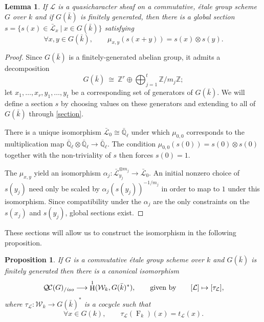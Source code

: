\documentclass[11pt]{amsart}
\theoremstyle{plain}
\newtheorem{proposition}[theorem]{Proposition}
\newtheorem{lemma}[theorem]{Lemma}
\theoremstyle{definition}
\theoremstyle{remark}
\newcommand{\ZZ}{{\mathbb{Z}}}
\newcommand{\EE}{\mathbb{\bar Q}_\ell}
\newcommand{\bFq}{\bar{k}}
\newcommand{\Fq}{k}
\newcommand{\Frob}[1]{\operatorname{F}_{#1}}
\DeclareMathOperator{\Hh}{H}
\newcommand{\tq}{{\ \vert\ }}
\newcommand{\iso}{{\ \cong\ }}
\newcommand{\cs}[1]{{\mathcal{#1}}}
\newcommand{\gcs}[1]{{\mathcal{\bar #1}}}
\newcommand{\QC}{{\mathcal{Q\hskip-0.8pt C}}}
\newcommand{\QCiso}[1]{\QC(#1)_{/\textit{iso}}}
\newcommand{\Weil}[1]{\mathcal{W}_{#1}}
\newcommand{\trFrob}[1]{t_{#1}}
\begin{document}
\begin{lemma}\label{lemma:section}
 If $\cs{L}$ is a quasicharacter sheaf on a commutative, \'etale group scheme $G$ over $\Fq$ and if $G(\bFq)$ is finitely generated, then there is a global section $s = \{ s(x) \in \gcs{L}_x \tq x \in G(\bFq) \}$ satisfying
 \begin{equation}\label{section}
  \forall x,y \in G(\bFq), \qquad \mu_{x,y}(s(x+y)) = s(x)\otimes s(y).
 \end{equation}
\end{lemma}

\begin{proof}
  Since $G(\bFq)$ is a finitely-generated abelian group, it admits a decomposition
  \[
  G(\bFq) \iso \ZZ^r \oplus \bigoplus_{j=1}^t \ZZ / m_j \ZZ;
  \]
  let $x_1, \ldots, x_r, y_1, \ldots, y_t$ be a corresponding set of generators of $G(\bFq)$.
  We will define a section $s$ by choosing values on these generators and extending to all
  of $G(\bFq)$ through \eqref{section}.
  
  There is a unique isomorphism $\gcs{L}_0 \cong \EE$ under which $\mu_{0,0}$ corresponds
  to the multiplication map $\EE \otimes \EE \to \EE$.
  The condition $\mu_{0,0}(s(0)) = s(0) \otimes s(0)$ together with the non-triviality of $s$
  then forces $s(0) = 1$.
  
  The $\mu_{x,y}$ yield an isomorphism $\alpha_j : \gcs{L}_{y_j}^{\otimes m_j} \to \gcs{L}_0$.
  An initial nonzero choice of $s(y_j)$ need only be scaled by $\alpha_j(s(y_j))^{-1/m_j}$ in order to map to
  $1$ under this isomorphism.  Since compatibility under the $\alpha_j$ are the only constraints on the
  $s(x_j)$ and $s(y_j)$, global sections exist.
\end{proof}

These sections will allow us to construct the isomorphism in the following proposition.

\begin{proposition}\label{prop:etale}
  If $G$ is a commutative \'etale group scheme over $\Fq$ and
  $G(\bFq)$ is finitely generated then there is a canonical
  isomorphism
  \[
  \QCiso{G} \longrightarrow \Hh^1(\Weil{\Fq}, G(\bFq)^*),
  \qquad \text{given by}\qquad
  [\cs{L}] \mapsto [\tau_\cs{L}],
  \]
  where $\tau_\cs{L}: \Weil{\Fq}\to G(\bFq)^*$ is a cocycle such that
  \[
  \forall x\in G(\Fq), \qquad \tau_\cs{L}(\Frob{\Fq})(x) = \trFrob{\cs{L}}(x).
  \]
\end{proposition}
\end{document}
